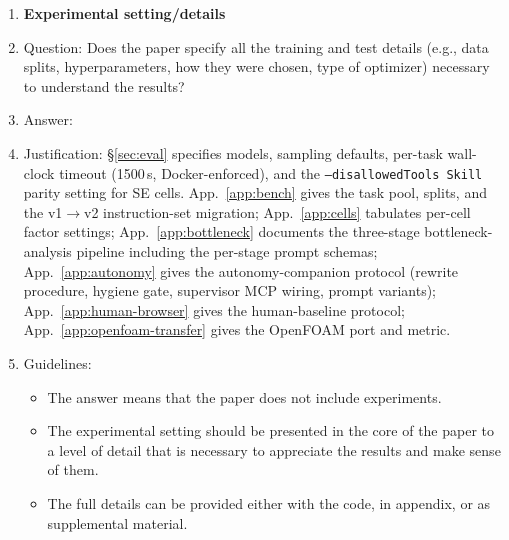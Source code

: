 \begin{enumerate}
\item {\bf Experimental setting/details}
    \item[] Question: Does the paper specify all the training and test details (e.g., data splits, hyperparameters, how they were chosen, type of optimizer) necessary to understand the results?
    \item[] Answer: \answerYes{}
    \item[] Justification: \S\ref{sec:eval} specifies models, sampling defaults, per-task wall-clock timeout (1500\,s, Docker-enforced), and the \texttt{--disallowedTools Skill} parity setting for SE cells. App.~\ref{app:bench} gives the task pool, splits, and the v1$\to$v2 instruction-set migration; App.~\ref{app:cells} tabulates per-cell factor settings; App.~\ref{app:bottleneck} documents the three-stage bottleneck-analysis pipeline including the per-stage prompt schemas; App.~\ref{app:autonomy} gives the autonomy-companion protocol (rewrite procedure, hygiene gate, supervisor MCP wiring, prompt variants); App.~\ref{app:human-browser} gives the human-baseline protocol; App.~\ref{app:openfoam-transfer} gives the OpenFOAM port and metric.
    \item[] Guidelines:
    \begin{itemize}
        \item The answer \answerNA{} means that the paper does not include experiments.
        \item The experimental setting should be presented in the core of the paper to a level of detail that is necessary to appreciate the results and make sense of them.
        \item The full details can be provided either with the code, in appendix, or as supplemental material.
    \end{itemize}


\end{enumerate}

